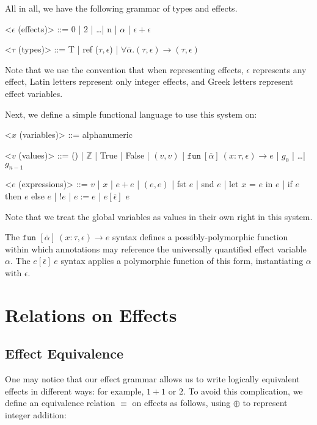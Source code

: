 \documentclass{article}
\newcommand{\Z}{\mathbb{Z}}
\begin{document}
All in all, we have the following grammar of types and effects.

\begin{grammar}
	<$\epsilon$ (effects)> ::= 0 | 2 | \dots | n | $\alpha$ | $\epsilon + \epsilon$
	
	<$\tau$ (types)> ::= T | ref ($\tau, \epsilon$) | $\forall \overline \alpha.(\tau, \epsilon) \rightarrow (\tau, \epsilon)$
\end{grammar}

Note that we use the convention that when representing effects, $\epsilon$ represents any effect, Latin letters represent only integer effects, and Greek letters represent effect variables.

Next, we define a simple functional language to use this system on:

\begin{grammar}
	<$x$ (variables)> ::= alphanumeric
	
	<$v$ (values)> ::= () | $\Z$ | True | False | $(v, v)$ | $\texttt{fun}\ [\overline \alpha]\ (x:\tau, \epsilon) \rightarrow e$ | $g_0$ | \dots | $g_{n-1}$
	
	<$e$ (expressions)> ::= $v$ | $x$ | $e + e$ | $(e,e)$ | fst $e$ | snd $e$ | let $x$ = $e$ in $e$ | if $e$ then $e$ else $e$ | !$e$ | $e := e$ | $e[\overline \epsilon]$ $e$
\end{grammar} 

Note that we treat the global variables as values in their own right in this system.

The $\texttt{fun } [\overline \alpha]\ (x : \tau, \epsilon) \rightarrow e$ syntax defines a possibly-polymorphic function within which annotations may reference the universally quantified effect variable $\alpha$. The $e [\overline \epsilon]\ e$ syntax applies a polymorphic function of this form, instantiating $\alpha$ with $\epsilon$.

\clearpage
\section*{Relations on Effects}
\subsection*{Effect Equivalence}
One may notice that our effect grammar allows us to write logically equivalent effects in different ways: for example, $1+1$ or $2$. To avoid this complication, we define an equivalence relation $\equiv$ on effects as follows, using $\oplus$ to represent integer addition:
\end{document}
